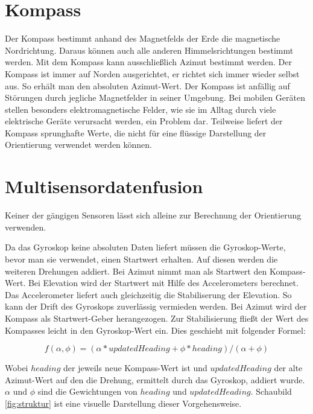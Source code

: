 \section{Kompass}
Der Kompass bestimmt anhand des Magnetfelds der Erde die magnetische Nordrichtung. Daraus können auch alle anderen Himmelsrichtungen bestimmt werden. Mit dem Kompass kann ausschließlich Azimut bestimmt werden. Der Kompass ist immer auf Norden ausgerichtet, er richtet sich immer wieder selbst aus. So erhält man den absoluten Azimut-Wert. Der Kompass ist anfällig auf Störungen durch jegliche Magnetfelder in seiner Umgebung. Bei mobilen Geräten stellen besonders elektromagnetische Felder, wie sie im Alltag durch viele elektrische Geräte verursacht werden, ein Problem dar. Teilweise liefert der Kompass sprunghafte Werte, die nicht für eine flüssige Darstellung der Orientierung verwendet werden können.
  
\section{Multisensordatenfusion}
Keiner der gängigen Sensoren lässt sich alleine zur Berechnung der Orientierung verwenden.

Da das Gyroskop keine absoluten Daten liefert müssen die Gyroskop-Werte, bevor man sie verwendet, einen Startwert erhalten. Auf diesen werden die weiteren Drehungen addiert. Bei Azimut nimmt man als Startwert den Kompass-Wert. Bei Elevation wird der Startwert mit Hilfe des Accelerometers berechnet. Das Accelerometer liefert auch gleichzeitig die Stabiliserung der Elevation. So kann der Drift des Gyroskops zuverlässig vermieden werden. Bei Azimut wird der Kompass als Startwert-Geber herangezogen. Zur Stabilisierung fließt der Wert des Kompasses leicht in den Gyroskop-Wert ein. Dies geschieht mit folgender Formel:

$$f(\alpha, \phi) = (\alpha*updatedHeading +\phi*heading)/(\alpha+\phi)$$\label{formula001}

Wobei $heading$ der jeweils neue Kompass-Wert ist und $updatedHeading$ der alte Azimut-Wert auf den die Drehung, ermittelt durch das Gyroskop, addiert wurde. $\alpha$ und $\phi$ sind die Gewichtungen von $heading$ und $updatedHeading$. Schaubild \ref{fig:struktur} ist eine visuelle Darstellung dieser Vorgehensweise.
 


